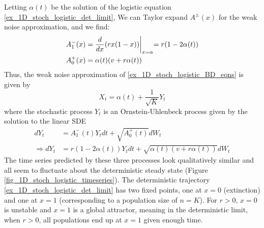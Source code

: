 Letting $\alpha(t)$ be the solution of the logistic equation \eqref{ex_1D_stoch_logistic_det_limit}, We can Taylor expand $A^{\pm}(x)$ for the weak noise approximation, and we find:
\begin{align*}
A^-_1(x) &= \frac{d}{dx}(rx(1-x))\biggl{|}_{x=\alpha} = r(1 - 2\alpha(t))\\
A^+_0(x) &= \alpha(t)(v+r\alpha(t))
\end{align*}
Thus, the weak noise approximation of \ref{ex_1D_stoch_logistic_BD_eqns} is given by
\begin{equation}
    X_t = \alpha(t) + \frac{1}{\sqrt{K}}Y_t
\end{equation}
where the stochastic process $Y_t$ is an Ornstein-Uhlenbeck process given by the solution to the linear SDE
\begin{align}
    dY_t &= A^-_1(t)Y_tdt + \sqrt{A^+_0(t)}dW_t\nonumber\\
    \Rightarrow dY_t &= r(1 - 2\alpha(t))Y_tdt + \sqrt{\alpha(t)(v+r\alpha(t))}dW_t\label{ex_1D_stoch_logistic_WNA}
\end{align}
The time series predicted by these three processes look qualitatively similar and all seem to fluctuate about the deterministic steady state (Figure \ref{fig_1D_stoch_logistic_timeseries}).
The deterministic trajectory \eqref{ex_1D_stoch_logistic_det_limit} has two fixed points, one at $x=0$ (extinction) and one at $x=1$ (corresponding to a population size of $n=K$). For $r > 0$, $x=0$ is unstable and $x=1$ is a global attractor, meaning in the deterministic limit, when $r > 0$, all populations end up at $x=1$ given enough time.
